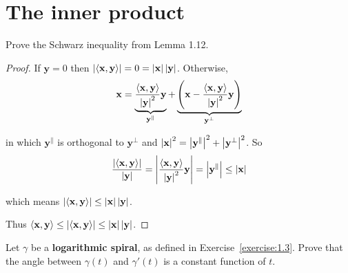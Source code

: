 \section{The inner product}

\begin{exercise}{1.15}
	Prove the Schwarz inequality from Lemma 1.12.
\end{exercise}

\begin{proof}
	If $\mathbf{y} = 0$ then $\left\vert{\left\langle{\mathbf{x}, \mathbf{y}}\right\rangle}\right\vert = 0 = \left\vert{\mathbf{x}}\right\vert\left\vert{\mathbf{y}}\right\vert$. Otherwise,
	\begin{align*}
		\mathbf{x} = \underbrace{\frac{\left\langle{\mathbf{x}, \mathbf{y}}\right\rangle}{\left\vert{\mathbf{y}}\right\vert^{2}}\mathbf{y}}_{\mathbf{y}^{\parallel}} + \underbrace{\left(\mathbf{x} - \frac{\left\langle{\mathbf{x}, \mathbf{y}}\right\rangle}{\left\vert{\mathbf{y}}\right\vert^{2}}\mathbf{y}\right)}_{\mathbf{y}^{\perp}}
	\end{align*}

	in which $\mathbf{y}^{\parallel}$ is orthogonal to $\mathbf{y}^{\perp}$ and $\left\vert{\mathbf{x}}\right\vert^{2} = \left\vert{\mathbf{y}^{\parallel}}\right\vert^{2} + \left\vert{\mathbf{y}^{\perp}}\right\vert^{2}$. So
	\begin{align*}
		\frac{\left\vert{\left\langle{\mathbf{x}, \mathbf{y}}\right\rangle}\right\vert}{\left\vert{\mathbf{y}}\right\vert} = \left\vert{\frac{\left\langle{\mathbf{x}, \mathbf{y}}\right\rangle}{\left\vert{\mathbf{y}}\right\vert^{2}}\mathbf{y}}\right\vert = \left\vert{\mathbf{y}^{\parallel}}\right\vert \leq \left\vert{\mathbf{x}}\right\vert
	\end{align*}

	which means $\left\vert{\left\langle{\mathbf{x}, \mathbf{y}}\right\rangle}\right\vert \leq \left\vert{\mathbf{x}}\right\vert\left\vert{\mathbf{y}}\right\vert$.

	Thus $\left\langle{\mathbf{x}, \mathbf{y}}\right\rangle \leq \left\vert{\left\langle{\mathbf{x}, \mathbf{y}}\right\rangle}\right\vert \leq \left\vert{\mathbf{x}}\right\vert\left\vert{\mathbf{y}}\right\vert$.
\end{proof}

\begin{exercise}{1.16}
	Let $\gamma$ be a \textbf{logarithmic spiral}, as defined in Exercise~\ref{exercise:1.3}. Prove that the angle between $\gamma(t)$ and $\gamma'(t)$ is a constant function of $t$.
\end{exercise}

